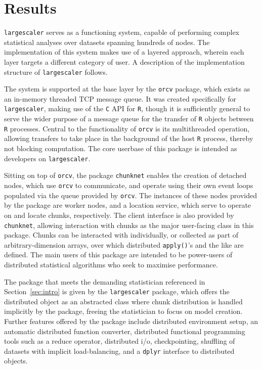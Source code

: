 \section{Results}

\texttt{largescaler} serves as a functioning system, capable of performing complex statistical analyses over datasets spanning hundreds of nodes.
The implementation of this system makes use of a layered approach, wherein each layer targets a different category of user.
A description of the implementation structure of \texttt{largescaler} follows.

The system is supported at the base layer by the \texttt{orcv} package, which exists as an in-memory threaded TCP message queue.
It was created specifically for \texttt{largescaler}, making use of the \texttt{C} API for \texttt{R}, though it is sufficiently general to serve the wider purpose of a message queue for the transfer of \texttt{R} objects between \texttt{R} processes.
Central to the functionality of \texttt{orcv} is its multithreaded operation, allowing transfers to take place in the background of the host \texttt{R} process, thereby not blocking computation.
The core userbase of this package is intended as developers on \texttt{largescaler}.

Sitting on top of \texttt{orcv}, the package \texttt{chunknet} enables the creation of detached nodes, which use \texttt{orcv} to communicate, and operate using their own event loops populated via the queue provided by \texttt{orcv}.
The instances of these nodes provided by the package are worker nodes, and a location service, which serve to operate on and locate chunks, respectively.
The client interface is also provided by \texttt{chunknet}, allowing interaction with chunks as the major user-facing class in this package.
Chunks can be interacted with individually, or collected as part of arbitrary-dimension arrays, over which distributed \texttt{apply()}'s and the like are defined.
The main users of this package are intended to be power-users of distributed statistical algorithms who seek to maximise performance.

The package that meets the demanding statistician referenced in Section~\ref{sec:intro} is given by the \texttt{largescaler} package, which offers the distributed object as an abstracted class where chunk distribution is handled implicitly by the package, freeing the statistician to focus on model creation. Further features offered by the package include distributed environment setup, an automatic distributed function converter, distributed functional programming tools such as a reduce operator, distributed i/o, checkpointing, shuffling of datasets with implicit load-balancing, and a \texttt{dplyr} interface to distributed objects.

